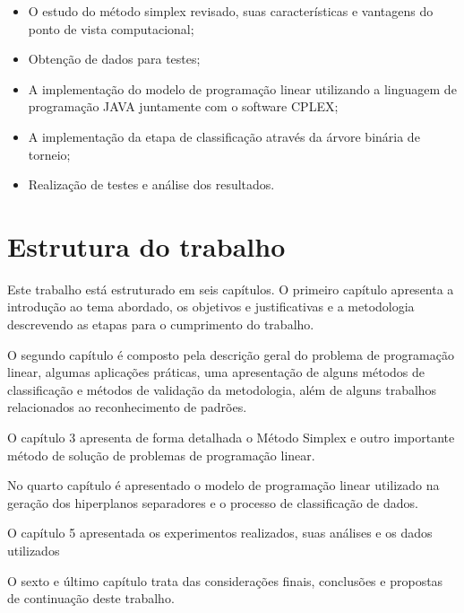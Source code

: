 \begin{itemize} 
\item O estudo do método simplex revisado, suas características e vantagens do ponto de vista computacional;
\item Obtenção de dados para testes;
\item A implementação do modelo de programação linear utilizando a linguagem de programação JAVA juntamente com o software CPLEX;
\item A implementação da etapa de classificação através da árvore binária de torneio;
\item Realização de testes e análise dos resultados.
\end{itemize}

\section{Estrutura do trabalho}
Este trabalho está estruturado em seis capítulos. O primeiro capítulo apresenta a introdução ao tema abordado, os objetivos e justificativas e a metodologia descrevendo as etapas para o cumprimento do trabalho.

O segundo capítulo é composto pela descrição geral do problema de programação linear, algumas aplicações práticas, uma apresentação de alguns métodos de classificação e métodos de validação da metodologia, além de alguns trabalhos relacionados ao reconhecimento de padrões.

O capítulo 3 apresenta de forma detalhada o Método Simplex e outro importante método de solução de problemas de programação linear.

No quarto capítulo é apresentado o modelo de programação linear utilizado na geração dos hiperplanos separadores e o processo de classificação de dados.

O capítulo 5 apresentada os experimentos realizados, suas análises e os dados utilizados

O sexto e último capítulo trata das considerações finais, conclusões e propostas de continuação deste trabalho.
